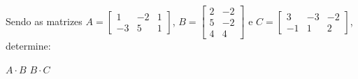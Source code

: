\documentclass[a4paper,11pt,addpoints]{exam}
\begin{document}
\begin{questions}
	\question[3]

	Sendo as matrizes $A = \begin{bmatrix}
			1 & -2 & 1 \\
			-3 & 5 & 1
		\end{bmatrix}$, $B = \begin{bmatrix}
			2 & -2 \\
			5 & -2 \\
			4 & 4
		\end{bmatrix}$ e $C = \begin{bmatrix}
			3  & -3 & -2  \\
			-1 & 1  & 2
		\end{bmatrix}$, determine:

	\begin{tasks}
		\task $A \cdot B$
		\task $B \cdot C$
	\end{tasks}


\end{questions}
\end{document}
